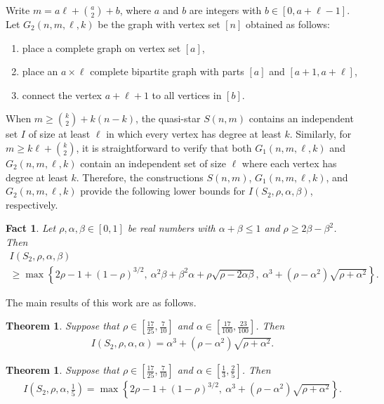 \documentclass[11pt,a4paper]{article}
\newtheorem{theorem}[definition]{Theorem}
\newtheorem{fact}[definition]{Fact}
\begin{document}
Write $m = a\ell + \binom{a}{2} + b$, where $a$ and $b$ are integers with $b \in [0, a+\ell-1]$. 
Let $G_{2}(n,m,\ell, k)$ be the graph with vertex set $[n]$ obtained as follows: 
\begin{enumerate}[label=(\roman*)]
    \item place a complete graph on vertex set $[a]$, 
    \item place an $a \times \ell$ complete bipartite graph with parts $[a]$ and $[a+1, a+\ell]$, 
    \item connect the vertex $a+\ell+1$ to all vertices in $[b]$. 
\end{enumerate}

When $m \ge \binom{k}{2} + k(n-k)$, the quasi-star $S(n,m)$ contains an independent set $I$ of size at least $\ell$ in which every vertex has degree at least $k$. 
Similarly, for $m \ge k \ell + \binom{k}{2}$, it is straightforward to verify that both $G_{1}(n,m,\ell,k)$ and $G_{2}(n,m,\ell,k)$ contain an independent set of size $\ell$ where each vertex has degree at least $k$. 
Therefore, the constructions $S(n,m)$, $G_{1}(n,m,\ell,k)$, and $G_{2}(n,m,\ell,k)$ provide the following lower bounds for $I(S_2,\rho,\alpha,\beta)$, respectively. 
%
\begin{fact}\label{FACT:lower-bound}
    Let $\rho, \alpha, \beta \in [0,1]$ be real numbers with $\alpha + \beta \le 1$ and $\rho \ge 2 \beta -\beta^2$. 
    Then 
    \begin{multline*}
        I(S_2,\rho,\alpha,\beta) \\
        \ge \max\left\{ 2\rho -1 +(1-\rho)^{3/2},~\alpha^2\beta + \beta^2 \alpha + \rho \sqrt{\rho-2\alpha \beta},~\alpha^3+(\rho-\alpha^2)\sqrt{\rho+\alpha^2} \right\}. 
    \end{multline*}
\end{fact}


The main results of this work are as follows.
%
\begin{theorem}\label{Thm:Max-S2-alpha-alpha}
    Suppose that $\rho \in \left[\frac{17}{25}, \frac{7}{10} \right]$ and $\alpha \in \left[\frac{17}{100}, \frac{23}{100}\right]$. 
    Then
    \begin{align*}%
        I(S_2,\rho, \alpha, \alpha) 
        = \alpha^3+(\rho-\alpha^2) \sqrt{\rho+\alpha^2}. 
    \end{align*}
\end{theorem}


\begin{theorem}\label{Thm:Max-S2-alpha-beta}
    Suppose that $\rho \in \left[\frac{17}{25}, \frac{7}{10}\right]$ and $\alpha \in \left[\frac{1}{3}, \frac{2}{5}\right]$. 
    Then 
    \begin{align*}
        I\left(S_2,\rho,\alpha, \tfrac{1}{5} \right) 
        = \max\left\{2\rho -1 +(1-\rho)^{3/2},~\alpha^3+(\rho-\alpha^2) \sqrt{\rho+\alpha^2}\right\}. 
    \end{align*}
\end{theorem}
\end{document}
